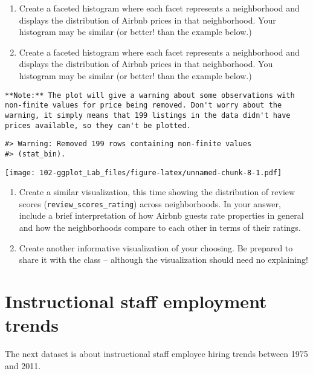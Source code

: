 \documentclass[
]{book}
\begin{document}
\begin{enumerate}
\def\labelenumi{\arabic{enumi}.}
\setcounter{enumi}{3}
\item
  Create a faceted histogram where each facet represents a neighborhood and displays the distribution of Airbnb prices in that neighborhood. Your histogram may be similar (or better! than the example below.)
\item
  Create a faceted histogram where each facet represents a neighborhood and displays the distribution of Airbnb prices in that neighborhood. You histogram may be similar (or better! than the example below.)
\end{enumerate}

\begin{verbatim}
**Note:** The plot will give a warning about some observations with non-finite values for price being removed. Don't worry about the warning, it simply means that 199 listings in the data didn't have prices available, so they can't be plotted.
\end{verbatim}

\begin{verbatim}
#> Warning: Removed 199 rows containing non-finite values
#> (stat_bin).
\end{verbatim}

\texttt{[image: 102-ggplot\_Lab\_files/figure-latex/unnamed-chunk-8-1.pdf]}

\begin{enumerate}
\def\labelenumi{\arabic{enumi}.}
\setcounter{enumi}{5}
\item
  Create a similar visualization, this time showing the distribution of review scores (\texttt{review\_scores\_rating}) across neighborhoods. In your answer, include a brief interpretation of how Airbnb guests rate properties in general and how the neighborhoods compare to each other in terms of their ratings.
\item
  Create another informative visualization of your choosing. Be prepared to share it with the class -- although the visualization should need no explaining!
\end{enumerate}

\hypertarget{instructional-staff-employment-trends}{%
\section{Instructional staff employment trends}\label{instructional-staff-employment-trends}}

The next dataset is about instructional staff employee hiring trends between 1975 and 2011.
\end{document}
